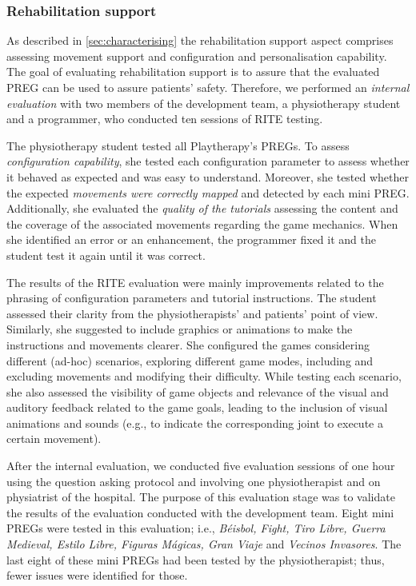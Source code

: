 \subsubsection{Rehabilitation support}
As described in \autoref{sec:characterising} the rehabilitation support aspect comprises assessing movement support and configuration and personalisation capability. The goal of evaluating rehabilitation support is to assure that the evaluated \ac{PREG} can be used to assure patients' safety. Therefore, we performed an \emph{internal evaluation} with two members of the development team, a physiotherapy student and a programmer, who conducted ten sessions of \ac{RITE} testing.

The physiotherapy student tested all Playtherapy's \acp{PREG}. To assess \textit{configuration capability}, she tested each configuration parameter to assess whether it behaved as expected and was easy to understand. Moreover, she tested whether the expected \textit{movements were correctly mapped} and detected by each mini \ac{PREG}. Additionally, she evaluated the \textit{quality of the tutorials} assessing the content and the coverage of the associated movements regarding the game mechanics. When she identified an error or an enhancement, the programmer fixed it and the student test it again until it was correct.

The results of the \ac{RITE} evaluation were mainly improvements related to the phrasing of configuration parameters and tutorial instructions. The student assessed their clarity from the physiotherapists' and patients' point of view. Similarly, she suggested to include graphics or animations to make the instructions and movements clearer. She configured the games considering different (ad-hoc) scenarios, exploring different game modes, including and excluding movements and modifying their difficulty. While testing each scenario, she also assessed the visibility of game objects and relevance of the visual and auditory feedback related to the game goals, leading to the inclusion of visual animations and sounds (e.g., to indicate the corresponding joint to execute a certain movement).

After the internal evaluation, we conducted five evaluation sessions of one hour using the question asking protocol and involving one physiotherapist and on physiatrist of the hospital. The purpose of this evaluation stage was to validate the results of the evaluation conducted with the development team. Eight mini \acp{PREG} were tested in this evaluation; i.e., \textit{Béisbol, Fight, Tiro Libre, Guerra Medieval, Estilo Libre, Figuras Mágicas, Gran Viaje} and \textit{Vecinos Invasores}. The last eight of these mini \acp{PREG} had been tested by the physiotherapist; thus, fewer issues were identified for those.

